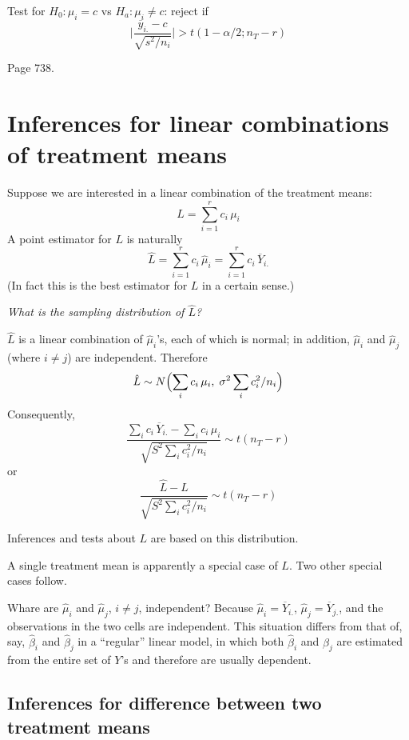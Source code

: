 \documentclass[12pt]{article}
\begin{document}
Test for $H_0: \mu_i = c$ vs $H_a: \mu_i \ne c$:
reject if
\[
\biggl|\frac{\overline{y}_{i.} - c}{\sqrt{s^2/n_i}}\biggr|
> t(1-\alpha/2; n_T - r)
\]


\example Page 738.

\section{Inferences for linear combinations of treatment means}

Suppose we are interested in a linear combination of the treatment
means:
\[
L = \sum_{i=1}^r c_i \,\mu_i
\]
A point estimator for $L$ is naturally
\[
\hat{L}
= \sum_{i=1}^r c_i \,\hat{\mu}_i
= \sum_{i=1}^r c_i \,\overline{Y}_{i.}
\]
(In fact this is the best estimator for $L$ in a certain sense.)

\emph{What is the sampling distribution of $\hat{L}$?}

$\hat{L}$ is a linear combination of $\hat{\mu}_i$'s,
each of which is normal; in addition, $\hat{\mu}_i$ and $\hat{\mu}_j$
(where $i\ne j$) are independent. Therefore
\[
\hat{L} \sim N\Bigl(
    \sum_i c_i \,\mu_i,\;
    \sigma^2\sum_i c_i^2/n_i
    \Bigr)
\]
Consequently,
\[
\frac{\sum_i c_i\,\overline{Y}_{i.} - \sum_i c_i \,\mu_i}{
    \sqrt{S^2\sum_i c_i^2/n_i}}
\sim t(n_T - r)
\]
or
\[
\frac{\hat{L} - L}{\sqrt{S^2\sum_i c_i^2/n_i}}
\sim t(n_T - r)
\]

Inferences and tests about $L$ are based on this distribution.

A single treatment mean is apparently a special case of $L$.
Two other special cases follow.

\alert
Whare are $\hat{\mu}_i$ and $\hat{\mu}_j$, $i\ne j$,
independent?
Because $\hat{\mu}_i = \overline{Y}_{i.}$,
$\hat{\mu}_j = \overline{Y}_{j.}$,
and the observations in the two cells are independent.
This situation differs from that of, say,
$\hat\beta_i$ and $\hat\beta_j$ in a ``regular'' linear model,
in which both $\hat\beta_i$ and $\hat\beta_j$
are estimated from the entire set of $Y$'s and therefore
are usually dependent.

\subsection*{Inferences for difference between two treatment means}
\end{document}
